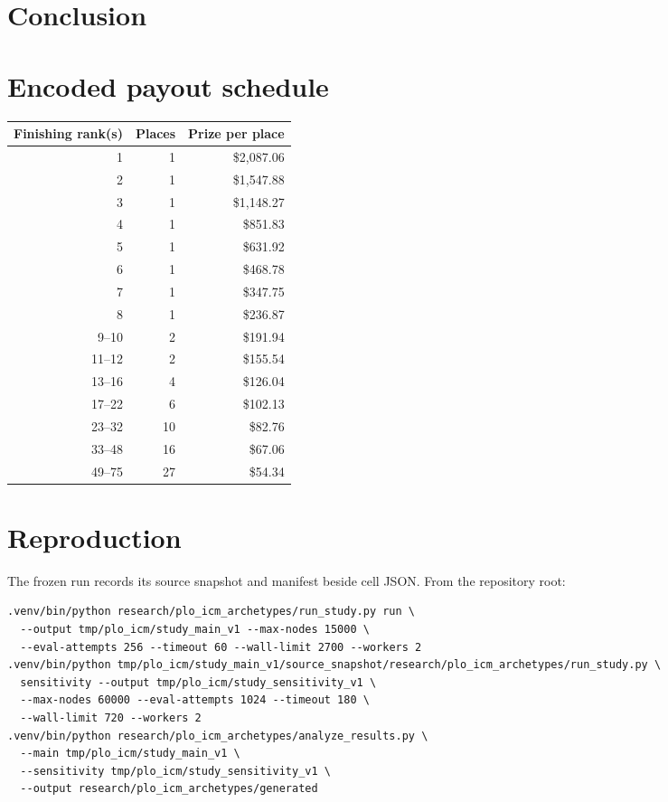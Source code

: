 \documentclass[10pt]{article}
\begin{document}
\pagebreak[3]
\section{Conclusion}


\appendix
\section{Encoded payout schedule}
\begin{center}
\begin{tabular}{rrr}
\toprule
Finishing rank(s) & Places & Prize per place \\
\midrule
1 & 1 & \$2,087.06 \\
2 & 1 & \$1,547.88 \\
3 & 1 & \$1,148.27 \\
4 & 1 & \$851.83 \\
5 & 1 & \$631.92 \\
6 & 1 & \$468.78 \\
7 & 1 & \$347.75 \\
8 & 1 & \$236.87 \\
9--10 & 2 & \$191.94 \\
11--12 & 2 & \$155.54 \\
13--16 & 4 & \$126.04 \\
17--22 & 6 & \$102.13 \\
23--32 & 10 & \$82.76 \\
33--48 & 16 & \$67.06 \\
49--75 & 27 & \$54.34 \\
\bottomrule
\end{tabular}
\end{center}

\section*{Reproduction}
The frozen run records its source snapshot and manifest beside cell JSON. From the repository root:
{\scriptsize
\begin{verbatim}
.venv/bin/python research/plo_icm_archetypes/run_study.py run \
  --output tmp/plo_icm/study_main_v1 --max-nodes 15000 \
  --eval-attempts 256 --timeout 60 --wall-limit 2700 --workers 2
.venv/bin/python tmp/plo_icm/study_main_v1/source_snapshot/research/plo_icm_archetypes/run_study.py \
  sensitivity --output tmp/plo_icm/study_sensitivity_v1 \
  --max-nodes 60000 --eval-attempts 1024 --timeout 180 \
  --wall-limit 720 --workers 2
.venv/bin/python research/plo_icm_archetypes/analyze_results.py \
  --main tmp/plo_icm/study_main_v1 \
  --sensitivity tmp/plo_icm/study_sensitivity_v1 \
  --output research/plo_icm_archetypes/generated
\end{verbatim}
}
\end{document}
